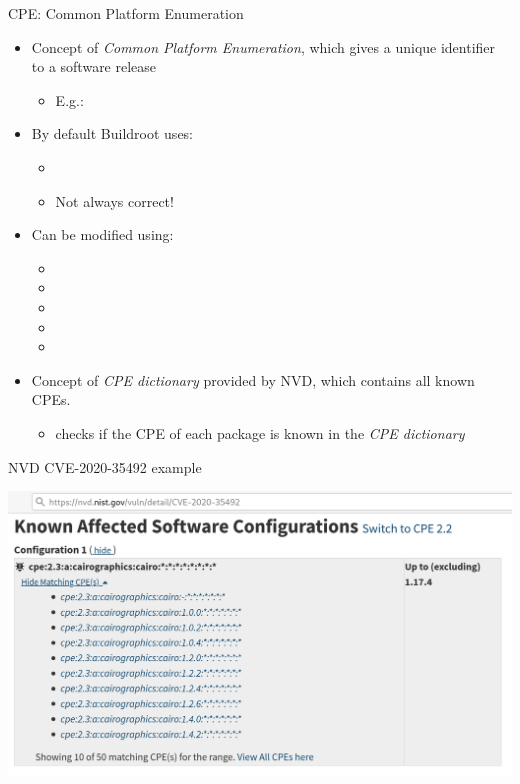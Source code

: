 \begin{frame}{CPE: Common Platform Enumeration}
  \begin{itemize}
  \item Concept of {\em Common Platform Enumeration}, which gives a
    unique identifier to a software release
    \begin{itemize}
    \item E.g.: 
    \end{itemize}
  \item By default Buildroot uses:
    \begin{itemize}
    \item {}
    \item Not always correct!
    \end{itemize}
  \item Can be modified using:
    \begin{itemize}
    \item {}
    \item {}
    \item {}
    \item {}
    \item {}
    \end{itemize}
  \item Concept of {\em CPE dictionary} provided by NVD, which
    contains all known CPEs.
    \begin{itemize}
    \item
       checks if the CPE of each package is known in the {\em CPE dictionary}
    \end{itemize}
  \end{itemize}
\end{frame}

\begin{frame}{NVD CVE-2020-35492 example}
  \begin{center}
    \includegraphics[height=0.8\textheight]{slides/buildroot-advanced-packages/nvd-example.png}
  \end{center}
\end{frame}

